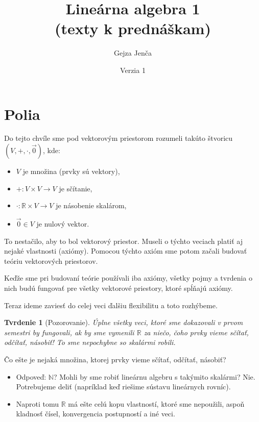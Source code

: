 \documentclass[11pt,a4paper]{article}
\theoremstyle{definition}
\theoremstyle{plain}
\newtheorem{tvrdenie}[definicia]{Tvrdenie}
\theoremstyle{remark}
\newcommand{\Nat}{\mathbb{N}}
\newcommand{\R}{\mathbb{R}}
\begin{document}
\title{Lineárna algebra 1\\(texty k prednáškam)}
\author{Gejza Jenča}
\date{Verzia 1}
\maketitle
\tableofcontents

\section{Polia}

Do tejto chvíle sme pod vektorovým priestorom rozumeli takúto štvoricu $(V, +, \cdot, \vec{0})$, kde:
\begin{itemize}
    \item $V$ je množina (prvky sú vektory),
    \item $+: V \times V \to V$ je sčítanie,
    \item $\cdot: \R \times V \to V$ je násobenie skalárom,
    \item $\vec{0} \in V$ je nulový vektor.
\end{itemize}

To nestačilo, aby to bol vektorový priestor. Museli o týchto veciach platiť aj nejaké vlastnosti (axiómy). Pomocou týchto axióm sme potom začali budovať teóriu vektorových priestorov.

Keďže sme pri budovaní teórie používali iba axiómy, všetky pojmy a tvrdenia o nich budú fungovať pre všetky vektorové priestory, ktoré spĺňajú axiómy.

Teraz ideme zaviesť do celej veci ďalšiu flexibilitu a toto rozhýbeme.

\begin{tvrdenie}[Pozorovanie]
Úplne všetky veci, ktoré sme dokazovali v prvom semestri by fungovali, ak by sme vymenili $\R$ za niečo, čoho prvky vieme sčítať, odčítať, násobiť! To sme nepochybne so skalármi robili.
\end{tvrdenie}

Čo ešte je nejaká množina, ktorej prvky vieme sčítať, odčítať, násobiť?
\begin{itemize}
    \item Odpoveď: $\Nat$? Mohli by sme robiť lineárnu algebru s takýmito skalármi? Nie. Potrebujeme deliť (napríklad keď riešime sústavu lineárnych rovníc).
    \item Naproti tomu $\R$ má ešte celú kopu vlastností, ktoré sme nepoužili, aspoň kladnosť čísel, konvergencia postupností a iné veci.
\end{itemize}
\end{document}
